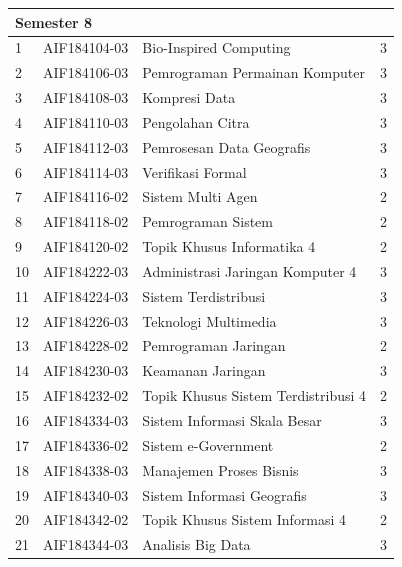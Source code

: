 \documentclass[a4paper,twoside]{article}
\begin{document}
\begin{enumerate}
\begin{enumerate}
\begin{table}[H]
\begin{tabular}{|p{0.5cm}|p{2.85cm}|p{4.95cm}|p{2.7cm}|}
\multicolumn{4}{|l|}{\textbf{Semester 8}}                                \\ \hline
1   & AIF184104-03    & Bio-Inspired Computing                     & 3   \\ \hline
2   & AIF184106-03    & Pemrograman Permainan Komputer             & 3   \\ \hline
3   & AIF184108-03    & Kompresi Data                              & 3   \\ \hline
4   & AIF184110-03    & Pengolahan Citra                           & 3   \\ \hline
5   & AIF184112-03    & Pemrosesan Data Geografis                  & 3   \\ \hline
6   & AIF184114-03    & Verifikasi Formal                          & 3   \\ \hline
7   & AIF184116-02    & Sistem Multi Agen                          & 2   \\ \hline
8   & AIF184118-02    & Pemrograman Sistem                         & 2   \\ \hline
9   & AIF184120-02    & Topik Khusus Informatika 4                 & 2   \\ \hline
10  & AIF184222-03    & Administrasi Jaringan Komputer 4           & 3   \\ \hline
11  & AIF184224-03    & Sistem Terdistribusi                       & 3   \\ \hline
12  & AIF184226-03    & Teknologi Multimedia                       & 3   \\ \hline
13  & AIF184228-02    & Pemrograman Jaringan                       & 2   \\ \hline
14  & AIF184230-03    & Keamanan Jaringan                          & 3   \\ \hline
15  & AIF184232-02    & Topik Khusus Sistem Terdistribusi 4        & 2   \\ \hline
16  & AIF184334-03    & Sistem Informasi Skala Besar               & 3   \\ \hline
17  & AIF184336-02    & Sistem e-Government                        & 2   \\ \hline
18  & AIF184338-03    & Manajemen Proses Bisnis                    & 3   \\ \hline
19  & AIF184340-03    & Sistem Informasi Geografis                 & 3   \\ \hline
20  & AIF184342-02    & Topik Khusus Sistem Informasi 4            & 2   \\ \hline
21  & AIF184344-03 & Analisis Big Data                          & 3   \\ \hline
		\end{tabular}
	\label{tab:kuliahpilihan_3}
\end{table}


\end{enumerate}
\end{enumerate}
\end{document}

